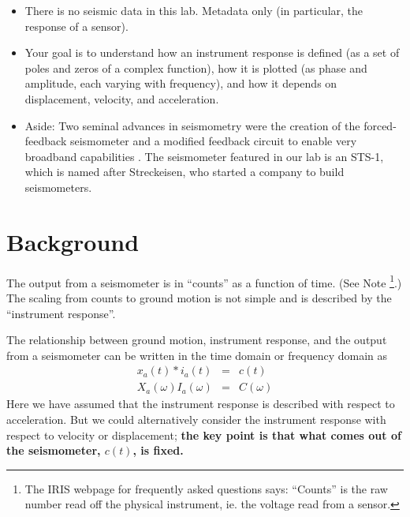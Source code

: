 \documentclass[11pt,titlepage,fleqn]{article}
\begin{document}
\begin{itemize}




\item There is no seismic data in this lab. Metadata only (in particular, the response of a sensor).


\item Your goal is to understand how an instrument response is defined (\eg as a set of poles and zeros of a complex function), how it is plotted (\eg as phase and amplitude, each varying with frequency), and how it depends on displacement, velocity, and acceleration.


\item Aside: Two seminal advances in seismometry were the creation of the forced-feedback seismometer \citep{WielandtStreckeisen1982} and a modified feedback circuit to enable very broadband capabilities \citep{WielandtSteim1986}. The seismometer featured in our lab is an STS-1, which is named after Streckeisen, who started a company to build seismometers.

\end{itemize}


\section{Background}

The output from a seismometer is in ``counts'' as a function of time. (See Note \footnote{The IRIS webpage for frequently asked questions says: ``Counts'' is the raw number read off the physical instrument, ie. the voltage read from a sensor.}.) The scaling from counts to ground motion is not simple and is described by the ``instrument response''.

The relationship between ground motion, instrument response, and the output from a seismometer can be written in the time domain or frequency domain as
%
\begin{eqnarray}
x_a(t) * i_a(t) &=& c(t)
\\
X_a(\omega) I_a(\omega) &=& C(\omega)
\end{eqnarray}
%
Here we have assumed that the instrument response is described with respect to acceleration. But we could alternatively consider the instrument response with respect to velocity or displacement; {\bf the key point is that what comes out of the seismometer, $c(t)$, is fixed.}
\end{document}
